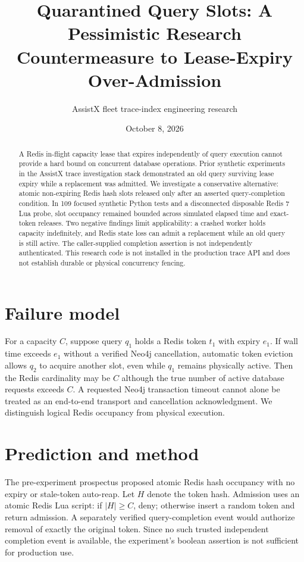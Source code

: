 \documentclass[11pt]{article}
\title{Quarantined Query Slots: A Pessimistic Research Countermeasure to Lease-Expiry Over-Admission}
\author{AssistX fleet trace-index engineering research}
\date{October 8, 2026}
\begin{document}
\maketitle
\begin{abstract}
A Redis in-flight capacity lease that expires independently of query execution cannot provide a hard bound on concurrent database operations. Prior synthetic experiments in the AssistX trace investigation stack demonstrated an old query surviving lease expiry while a replacement was admitted. We investigate a conservative alternative: atomic non-expiring Redis hash slots released only after an asserted query-completion condition. In 109 focused synthetic Python tests and a disconnected disposable Redis 7 Lua probe, slot occupancy remained bounded across simulated elapsed time and exact-token releases. Two negative findings limit applicability: a crashed worker holds capacity indefinitely, and Redis state loss can admit a replacement while an old query is still active. The caller-supplied completion assertion is not independently authenticated. This research code is not installed in the production trace API and does not establish durable or physical concurrency fencing.
\end{abstract}
\section{Failure model}
For a capacity $C$, suppose query $q_1$ holds a Redis token $t_1$ with expiry $e_1$. If wall time exceeds $e_1$ without a verified Neo4j cancellation, automatic token eviction allows $q_2$ to acquire another slot, even while $q_1$ remains physically active. Then the Redis cardinality may be $C$ although the true number of active database requests exceeds $C$. A requested Neo4j transaction timeout cannot alone be treated as an end-to-end transport and cancellation acknowledgment. We distinguish logical Redis occupancy from physical execution.
\section{Prediction and method}
The pre-experiment prospectus proposed atomic Redis hash occupancy with no expiry or stale-token auto-reap. Let $H$ denote the token hash. Admission uses an atomic Redis Lua script: if $|H|\ge C$, deny; otherwise insert a random token and return admission. A separately verified query-completion event would authorize removal of exactly the original token. Since no such trusted independent completion event is available, the experiment's boolean assertion is not sufficient for production use.
\end{document}
